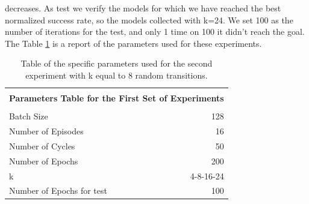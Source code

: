 \documentclass[a4paper]{report}
\begin{document}
decreases. As test we verify the models for which we have reached the best normalized success rate, so the models collected with k=24. We set 100 as the number of iterations for the test, and only 1 time on 100 it didn't reach the goal.
The Table \ref{exp2} is a report of the parameters used for these experiments.


\begin{table}[h]
\begin{center}
\begin{tabular}{|l|r|} 



\hline

\multicolumn{2}{|c|}{}\\
\multicolumn{2}{|c|}{\textbf{\large    Parameters Table for the First Set of Experiments}}\\
\multicolumn{2}{|c|}{}\\

\hline

Batch Size 					& 128			\\
Number of Episodes			& 16			\\
Number of Cycles			& 50			\\
Number of Epochs			& 200			\\
k							& 4-8-16-24		\\
Number of Epochs for test	& 100			\\


\hline
\end{tabular}
\end{center}
\caption{\label{exp2} Table of the specific parameters used for the second experiment with k equal to 8 random transitions.}
\end{table}
\end{document}
